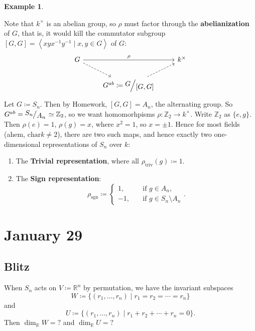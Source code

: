 \documentclass[12pt]{article}
\newcommand{\z}{\mathbb{Z}}
\newcommand{\real}{\mathbb{R}}
\newcommand\inv[1]{#1^{-1}}
\newcommand{\vbrack}[1]{\left \langle #1 \right \rangle}
\newcommand{\quotient}[2]{{\makebox[\width-2.3pt][l]{\raisebox{.2em}{$#1$}}\left/\raisebox{-.2em}{$#2$}\right.}}
\theoremstyle{definition}
\newtheorem{example}{Example}[section]
\DeclareMathOperator\sgn{sgn}
\begin{document}
\begin{example}
\begin{enumerate}
\begin{equation}
        \end{equation}
        Note that $k^{\times}$ is an abelian group, so $\rho$ must factor through the \textbf{abelianization} of $G$, that is, it would kill the commutator subgroup $[G,G]=\vbrack{xy\inv{x}\inv{y}\mid x,y\in G}$ of $G$:
        \begin{equation}
             \begin{tikzcd}
                G \arrow[rr,"\rho"] \arrow[dr,dashed] & & k^{\times} \\
                & G^{ab}\coloneqq \quotient{G}{[G,G]}  \arrow[ur,dashed] & 
            \end{tikzcd}
        \end{equation}
        Let $G\coloneqq S_n$. Then by Homework, $[G,G]=A_n$, the alternating group. So $G^{ab}=\quotient{S_n}{A_n}\simeq\z_2$, so we want homomorhpisms $\rho:\z_2\to k^{\times}$. Write $\z_2$ as $\{e,g\}$. Then $\rho(e)=1$, $\rho(g)=x$, where $x^2=1$, so $x=\pm1$. Hence for most fields (ahem, $\mathrm{char}k\neq2$), there are two such maps, and hence exactly two one-dimensional representations of $S_n$ over $k$:
        \begin{enumerate}
            \item The \textbf{Trivial representation}, where all $\rho_{\mathrm{triv}}(g)\coloneqq 1$.
            \item The \textbf{Sign representation}:
            \begin{equation}
                \rho_{\sgn}\coloneqq 
                \begin{cases}
                    1,&\quad\text{if }g\in A_n,\\
                    -1,&\quad\text{if }g\in S_n\setminus A_n
                \end{cases}.
            \end{equation}
        \end{enumerate}
    \end{enumerate}
\end{example}
\section{January 29}
\subsection{Blitz}
When $S_n$ acts on $V\coloneqq \real^n$ by permutation, we have the invariant subspaces 
\[W\coloneqq \{(r_1,\dotsc,r_n)\mid r_1=r_2=\dotsb=r_n\}\]
and
\[U\coloneqq \{(r_1,\dotsc,r_n)\mid r_1+r_2+\dotsb+r_n=0\}.\]
Then $\dim_{\real}W=?$ and $\dim_{\real}U=?$
\end{document}
